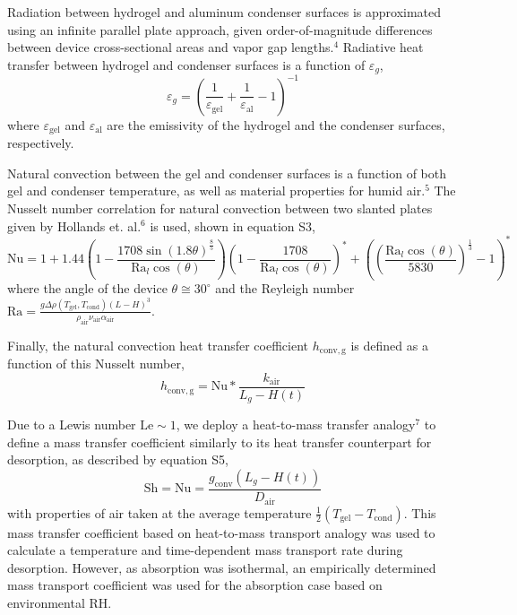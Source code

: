 \documentclass[11pt]{article}
\begin{document}
Radiation between hydrogel and aluminum condenser surfaces is approximated using an infinite parallel plate approach, given order-of-magnitude differences between device cross-sectional areas and vapor gap lengths.$^{4}$ Radiative heat transfer between hydrogel and condenser surfaces is a function of $\varepsilon_{g}$,
\begin{equation}
\varepsilon_{g} = \left(\frac{1}{\varepsilon_{\mathrm{gel}}} + \frac{1}{\varepsilon_{\mathrm{al}}} - 1\right)^{-1}
\end{equation}
where $\varepsilon_{\mathrm{gel}}$ and $\varepsilon_{\mathrm{al}}$ are the emissivity of the hydrogel and the condenser surfaces, respectively.

Natural convection between the gel and condenser surfaces is a function of both gel and condenser temperature, as well as material properties for humid air.$^{5}$ The Nusselt number correlation for natural convection between two slanted plates given by Hollands et. al.$^{6}$ is used, shown in equation S3,
\begin{equation}
\mathrm{Nu} = 1 + 1.44\left(1 - \frac{1708\sin(1.8\theta)^{\frac{8}{5}}}{\mathrm{Ra}_{l}\cos(\theta)}\right)\left(1 - \frac{1708}{\mathrm{Ra}_{l}\cos(\theta)}\right)^{*} + \left(\left(\frac{\mathrm{Ra}_{l}\cos(\theta)}{5830}\right)^{\frac{1}{3}} - 1\right)^{*}
\end{equation}
where the angle of the device $\theta \cong 30^{\circ}$ and the Reyleigh number $\mathrm{Ra} = \frac{g\Delta\rho\left(T_{\mathrm{gel}},T_{\mathrm{cond}}\right)\left(L-H\right)^{3}}{\rho_{\mathrm{air}}\nu_{\mathrm{air}}\alpha_{\mathrm{air}}}$.

Finally, the natural convection heat transfer coefficient $h_{\mathrm{conv,g}}$ is defined as a function of this Nusselt number,
\begin{equation}
h_{\mathrm{conv,g}} = \mathrm{Nu} * \frac{k_{\mathrm{air}}}{L_{g} - H(t)}
\end{equation}

Due to a Lewis number $\mathrm{Le} \sim 1$, we deploy a heat-to-mass transfer analogy$^{7}$ to define a mass transfer coefficient similarly to its heat transfer counterpart for desorption, as described by equation S5,
\begin{equation}
\mathrm{Sh} = \mathrm{Nu} = \frac{g_{\mathrm{conv}}\left(L_{g} - H(t)\right)}{D_{\mathrm{air}}}
\end{equation}
with properties of air taken at the average temperature $\frac{1}{2}\left(T_{\mathrm{gel}} - T_{\mathrm{cond}}\right)$. This mass transfer coefficient based on heat-to-mass transport analogy was used to calculate a temperature and time-dependent mass transport rate during desorption. However, as absorption was isothermal, an empirically determined mass transport coefficient was used for the absorption case based on environmental RH.
\end{document}
